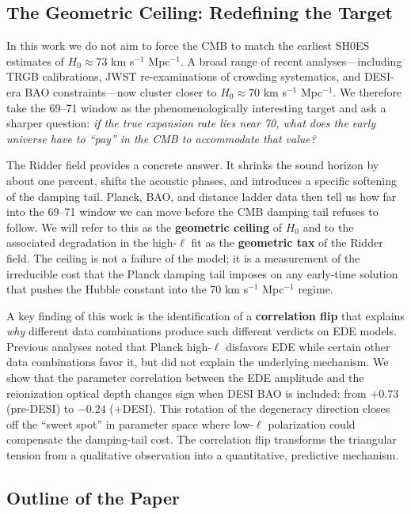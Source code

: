 \documentclass[a4paper,11pt]{article}
\begin{document}
\subsection{The Geometric Ceiling: Redefining the Target}

In this work we do not aim to force the CMB to match the earliest SH0ES estimates of $H_0 \approx 73$ km s$^{-1}$ Mpc$^{-1}$. A broad range of recent analyses---including TRGB calibrations, JWST re-examinations of crowding systematics, and DESI-era BAO constraints---now cluster closer to $H_0 \approx 70$ km s$^{-1}$ Mpc$^{-1}$. We therefore take the 69--71 window as the phenomenologically interesting target and ask a sharper question: \emph{if the true expansion rate lies near 70, what does the early universe have to ``pay'' in the CMB to accommodate that value?}

The Ridder field provides a concrete answer. It shrinks the sound horizon by about one percent, shifts the acoustic phases, and introduces a specific softening of the damping tail. Planck, BAO, and distance ladder data then tell us how far into the 69--71 window we can move before the CMB damping tail refuses to follow. We will refer to this as the \textbf{geometric ceiling} of $H_0$ and to the associated degradation in the high-$\ell$ fit as the \textbf{geometric tax} of the Ridder field. The ceiling is not a failure of the model; it is a measurement of the irreducible cost that the Planck damping tail imposes on any early-time solution that pushes the Hubble constant into the 70 km s$^{-1}$ Mpc$^{-1}$ regime.

A key finding of this work is the identification of a \textbf{correlation flip} that explains \emph{why} different data combinations produce such different verdicts on EDE models. Previous analyses noted that Planck high-$\ell$ disfavors EDE while certain other data combinations favor it, but did not explain the underlying mechanism. We show that the parameter correlation between the EDE amplitude and the reionization optical depth changes sign when DESI BAO is included: from $+0.73$ (pre-DESI) to $-0.24$ (+DESI). This rotation of the degeneracy direction closes off the ``sweet spot'' in parameter space where low-$\ell$ polarization could compensate the damping-tail cost. The correlation flip transforms the triangular tension from a qualitative observation into a quantitative, predictive mechanism.

\subsection{Outline of the Paper}
\end{document}
